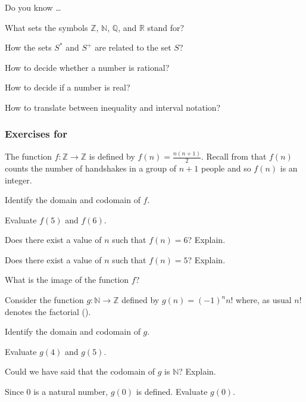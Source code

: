 \begin{exer}[\exerR] %
\label{exer_dyk_inf_sets_numbers}
    Do you know \ldots
        \begin{exerpart}
            \item What sets the symbols $\mathbb{Z}$, $\mathbb{N}$, $\mathbb{Q}$, and $\mathbb{R}$ stand for?
            \item How the sets $S^*$ and $S^+$ are related to the set $S$?
            \item How to decide whether a number is rational?
            \item How to decide if a number is real?
            \item How to translate between inequality and interval notation?
        \end{exerpart}
\end{exer}


\subsubsection*{Exercises for  \subdefnfnnotation}

\begin{exer}[\exerP] %
\label{exer_hs_nplus1}
    The function $f: \mathbb{Z} \to \mathbb{Z}$ is defined by $f(n) = \frac{n(n+1)}{2}$.  Recall from  that $f(n)$ counts the number of handshakes in a group of $n+1$ people and so $f(n)$ is an integer.
        \begin{exerpart}
            \item Identify the domain and codomain of $f$.
            \item Evaluate $f(5)$ and $f(6)$. 
            \item Does there exist a value of $n$ such that $f(n) =6$? Explain.
            \item Does there exist a value of $n$ such that $f(n) = 5$? Explain.
            \item What is the image of the function $f$?
        \end{exerpart}
\end{exer}

\begin{exer}[\exerU] %
\label{exer_alt_factorial}
    Consider the function $g: \mathbb{N} \to \mathbb{Z}$ defined by $g(n) = (-1)^nn!$ where, as usual $n!$ denotes the factorial ().
        \begin{exerpart}
            \item Identify the domain and codomain of $g$.
            \item Evaluate $g(4)$ and $g(5)$.  
            \item Could we have said that the codomain of $g$ is $\mathbb{N}$?  Explain.
            \item Since 0 is a natural number, $g(0)$ is defined.  Evaluate $g(0)$.
        \end{exerpart}
\end{exer}

